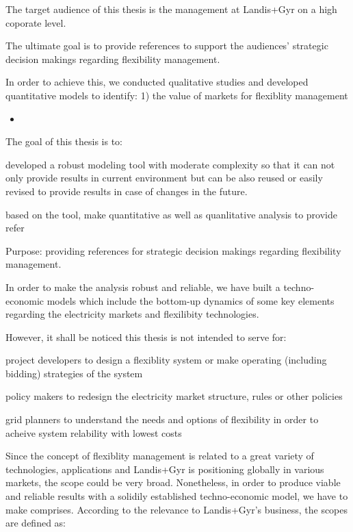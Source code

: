 The target audience of this thesis is the management at Landis+Gyr on a high coporate level.

The ultimate goal is to provide references to support the audiences' strategic decision makings regarding flexibility management.

In order to achieve this, we conducted qualitative studies and developed quantitative models to identify: 1) the value of markets for flexiblity management

\begin{itemize}
	\item 
\end{itemize}

The goal of this thesis is to:

developed a robust modeling tool with moderate complexity so that it can not only provide results in current environment but can be also reused or easily revised to provide results in case of changes in the future.

based on the tool, make quantitative as well as quanlitative analysis to provide refer 

Purpose: providing references for strategic decision makings regarding flexibility management.

In order to make the analysis robust and reliable, we have built a techno-economic models which include the bottom-up dynamics of some key elements regarding the electricity markets and flexilibity technologies. 

However, it shall be noticed this thesis is not intended to serve for:

project developers to design a flexiblity system or make operating (including bidding) strategies of the system

policy makers to redesign the electricity market structure, rules or other policies

grid planners to understand the needs and options of flexibility in order to acheive system relability with lowest costs


Since the concept of flexiblity management is related to a great variety of technologies, applications and Landis+Gyr is positioning globally in various markets, the scope could be very broad. Nonetheless, in order to produce viable and reliable results with a solidily established techno-economic model, we have to make comprises. According to the relevance to Landis+Gyr's business, the scopes are defined as:


